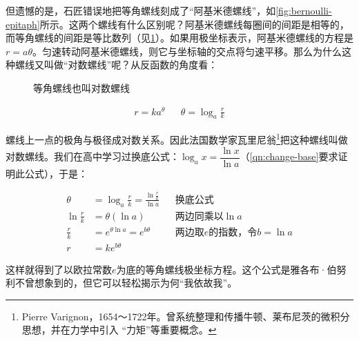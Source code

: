 \documentclass[b5paper]{ctexart}
\begin{document}
但遗憾的是，石匠错误地把等角螺线刻成了“阿基米德螺线”，如\cref{fig:bernoulli-epitaph}所示。这两个螺线有什么区别呢？阿基米德螺线每圈间的间距是相等的，而等角螺线的间距是等比数列（见\cref{fig:equiangular-spiral}）。如果用极坐标表示，阿基米德螺线的方程是$r = a\theta$。匀速转动阿基米德螺线，则它与坐标轴的交点将匀速平移。那么为什么这种螺线又叫做“对数螺线”呢？从反函数的角度看：

\begin{figure}[htbp]
 \centering
  \caption{等角螺线也叫对数螺线}
  \label{fig:equiangular-spiral}
\end{figure}

\begin{align*}
r = ka^\theta && \theta = \log_{a} \frac{r}{k}
\end{align*}

螺线上一点的极角与极径成对数关系。因此法国数学家瓦里尼翁\footnote{Pierre Varignon，1654～1722年。曾系统整理和传播牛顿、莱布尼茨的微积分思想，并在力学中引入 “力矩”等重要概念。}把这种螺线叫做对数螺线。我们在高中学习过换底公式：$\log_a x = \dfrac{\ln x}{\ln a}$（\cref{qn:change-base}要求证明此公式），于是：

\begin{align*}
\theta &= \log_a \frac{r}{k} = \frac{\ln \frac{r}{k}}{\ln a} && \text{换底公式}\\
\ln \frac{r}{k} &= \theta(\ln a) && \text{两边同乘以}\ln a \\
\frac{r}{k} &= e^{\theta \ln a} = e^{b\theta} && \text{两边取}e\text{的指数，令}b = \ln a \\
r &= k e^{b\theta}
\end{align*}

这样就得到了以欧拉常数$e$为底的等角螺线极坐标方程。这个公式是雅各布·伯努利不曾想象到的，但它可以轻松揭示为何“我依故我”。
\end{document}
